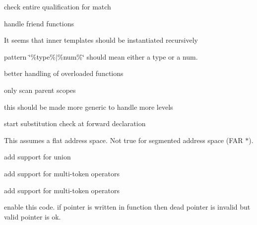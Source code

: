 \begin{DoxyRefList}
check entire qualification for match 

handle friend functions  
\item[\label{todo__todo000057}%
\hypertarget{todo__todo000057}{}%
Member \hyperlink{class_template_simplifier_a1635ce9ca865ed3644315e27a4a8382a}{Template\-Simplifier\-:\-:simplify\-Template\-Instantions} (\hyperlink{class_token_list}{Token\-List} \&tokenlist, \hyperlink{class_error_logger}{Error\-Logger} \&errorlogger, const \hyperlink{class_settings}{Settings} $\ast$\-\_\-settings, const \hyperlink{class_token}{Token} $\ast$tok, std\-::list$<$ Token $\ast$ $>$ \&template\-Instantiations, std\-::set$<$ std\-::string $>$ \&expandedtemplates)]It seems that inner templates should be instantiated recursively  
\item[\label{todo__todo000058}%
\hypertarget{todo__todo000058}{}%
Member \hyperlink{class_token_a519623098bde6496825e49364575dadf}{Token\-:\-:Match} (const \hyperlink{class_token}{Token} $\ast$tok, const char pattern\mbox{[}\mbox{]}, unsigned int varid=0)]pattern \char`\"{}\%type\%$|$\%num\%\char`\"{} should mean either a type or a num. 
\item[\label{todo__todo000065}%
\hypertarget{todo__todo000065}{}%
Member \hyperlink{class_tokenizer_a11af512dd37794e12d72718182000836}{Tokenizer\-:\-:get\-Function\-Token\-By\-Name} (const char funcname\mbox{[}\mbox{]}) const ]better handling of overloaded functions 

only scan parent scopes  
\item[\label{todo__todo000064}%
\hypertarget{todo__todo000064}{}%
Member \hyperlink{class_tokenizer_a45dd5bfee9a623306b4ee1e6c35931d0}{Tokenizer\-:\-:remove\-Unnecessary\-Qualification} ()]this should be made more generic to handle more levels  
\item[\label{todo__todo000063}%
\hypertarget{todo__todo000063}{}%
Member \hyperlink{class_tokenizer_a22ab871e265a798011be3869dca955db}{Tokenizer\-:\-:simplify\-Enum} ()]start substitution check at forward declaration  
\item[\label{todo__todo000062}%
\hypertarget{todo__todo000062}{}%
Member \hyperlink{class_tokenizer_a70690e32b126df2dce134c1cb8542165}{Tokenizer\-:\-:simplify\-Platform\-Types} ()]This assumes a flat address space. Not true for segmented address space (F\-A\-R $\ast$).  
\item[\label{todo__todo000059}%
\hypertarget{todo__todo000059}{}%
Member \hyperlink{class_tokenizer_a4adb4d624e0238e2482e452c92298c78}{Tokenizer\-:\-:simplify\-Typedef} ()]add support for union 

add support for multi-\/token operators 

add support for multi-\/token operators  
\item[\label{todo__todo000048}%
\hypertarget{todo__todo000048}{}%
Member \hyperlink{class_uninit_var_a68e9676afb263cf84d9edfcfdbb5fa2a}{Uninit\-Var\-:\-:analyse\-Functions} (const \hyperlink{class_token}{Token} $\ast$const tokens, std\-::set$<$ std\-::string $>$ \&func)]enable this code. if pointer is written in function then dead pointer is invalid but valid pointer is ok. 
\end{DoxyRefList}
